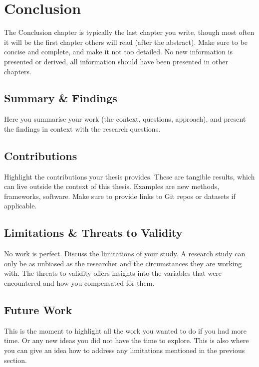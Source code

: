 \chapter{Conclusion}%
\label{ch:conclusion}

The Conclusion chapter is typically the last chapter you write, though most often it will be the first chapter others will read (after the abstract).
Make sure to be concise and complete, and make it not too detailed.
No new information is presented or derived, all information should have been presented in other chapters.

\section{Summary \& Findings}
Here you summarise your work (the context, questions, approach), and present the findings in context with the research questions.

\section{Contributions}
Highlight the contributions your thesis provides.
These are tangible results, which can live outside the context of this thesis.
Examples are new methods, frameworks, software.
Make sure to provide links to Git repos or datasets if applicable.

\section{Limitations \& Threats to Validity}
No work is perfect.
Discuss the limitations of your study.
A research study can only be as unbiased as the researcher and the circumstances they are working with.
The threats to validity offers insights into the variables that were encountered and how you compensated for them.

\section{Future Work}
This is the moment to highlight all the work you wanted to do if you had more time.
Or any new ideas you did not have the time to explore.
This is also where you can give an idea how to address any limitations mentioned in the previous section.